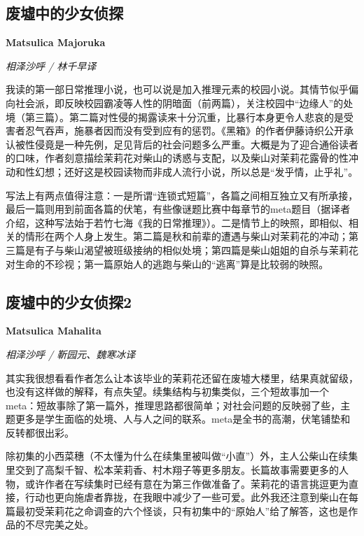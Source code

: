 \subsection*{废墟中的少女侦探}
\par \textbf{Matsulica Majoruka}
\par \emph{相泽沙呼 / 林千早译} 

\par 我读的第一部日常推理小说，也可以说是加入推理元素的校园小说。其情节似乎偏向社会派，即反映校园霸凌等人性的阴暗面（前两篇），关注校园中“边缘人”的处境（第三篇）。第二篇对性侵的揭露读来十分沉重，比暴行本身更令人悲哀的是受害者忍气吞声，施暴者因而没有受到应有的惩罚。《黑箱》的作者伊藤诗织公开承认被性侵竟是一种先例，足见背后的社会问题多么严重。大概是为了迎合通俗读者的口味，作者刻意描绘茉莉花对柴山的诱惑与支配，以及柴山对茉莉花露骨的性冲动和性幻想；还好这是校园读物而非成人流行小说，所以总是“发乎情，止乎礼”。
\par 写法上有两点值得注意：一是所谓“连锁式短篇”，各篇之间相互独立又有所承接，最后一篇则用到前面各篇的伏笔，有些像谜题比赛中每章节的meta题目（据译者介绍，这种写法始于若竹七海《我的日常推理》）。二是情节上的映照，即相似、相关的情形在两个人身上发生。第二篇是秋和前辈的遭遇与柴山对茉莉花的冲动；第三篇是有子与柴山渴望被班级接纳的相似处境；第四篇是柴山姐姐的自杀与茉莉花对生命的不珍视；第一篇原始人的逃跑与柴山的“逃离”算是比较弱的映照。
\par {}

\subsection*{废墟中的少女侦探2}
\par \textbf{Matsulica Mahalita}
\par \emph{相泽沙呼 / 靳园元、魏寒冰译}

\par 其实我很想看看作者怎么让本该毕业的茉莉花还留在废墟大楼里，结果真就留级，也没有这样做的解释，有点失望。续集结构与初集类似，三个短故事加一个meta：短故事除了第一篇外，推理思路都很简单；对社会问题的反映弱了些，主题更多是学生面临的处境、人与人之间的联系。meta是全书的高潮，伏笔铺垫和反转都很出彩。
\par 除初集的小西菜穗（不太懂为什么在续集里被叫做“小直”）外，主人公柴山在续集里交到了高梨千智、松本茉莉香、村木翔子等更多朋友。长篇故事需要更多的人物，或许作者在写续集时已经有意在为第三作做准备了。茉莉花的语言挑逗更为直接，行动也更向施虐者靠拢，在我眼中减少了一些可爱。此外我还注意到柴山在每篇最初受茉莉花之命调查的六个怪谈，只有初集中的“原始人”给了解答，这也是作品的不尽完美之处。
\par {}


